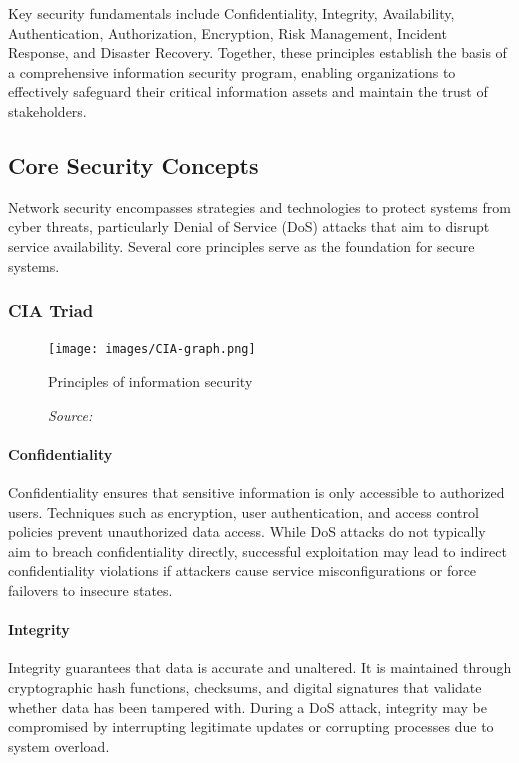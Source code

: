 \documentclass[16pt]{report}
\begin{document}
Key security fundamentals include Confidentiality, Integrity, Availability, Authentication, Authorization, Encryption, Risk Management, Incident Response, and Disaster Recovery. Together, these principles establish the basis of a comprehensive information security program, enabling organizations to effectively safeguard their critical information assets and maintain the trust of stakeholders.\cite{ibm_security_fundamental}

\subsection{Core Security Concepts}
Network security encompasses strategies and technologies to protect systems from cyber threats, particularly Denial of Service (DoS) attacks that aim to disrupt service availability. Several core principles serve as the foundation for secure systems.

\subsubsection{CIA Triad}
\begin{figure}[ht]
    \centering
    \texttt{[image: images/CIA-graph.png]}
    \caption{Principles of information security}
    \caption*{\footnotesize\textit{Source: \cite{ibm_principles_of_information_security}}}
    \label{fig:cia-graph}
\end{figure}

\paragraph{Confidentiality} 
Confidentiality ensures that sensitive information is only accessible to authorized users. Techniques such as encryption, user authentication, and access control policies prevent unauthorized data access. While DoS attacks do not typically aim to breach confidentiality directly, successful exploitation may lead to indirect confidentiality violations if attackers cause service misconfigurations or force failovers to insecure states.

\paragraph{Integrity} 
Integrity guarantees that data is accurate and unaltered. It is maintained through cryptographic hash functions, checksums, and digital signatures that validate whether data has been tampered with. During a DoS attack, integrity may be compromised by interrupting legitimate updates or corrupting processes due to system overload.
\end{document}
